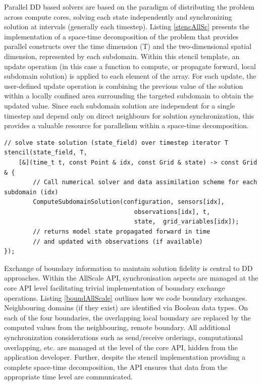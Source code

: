 \documentclass[acmsmall,review,anonymous]{acmart}\settopmatter{printfolios=true,printccs=false,printacmref=false}
\begin{document}
Parallel DD based solvers are based on the paradigm of distributing the problem across compute cores, solving each state independently and synchronizing solution at intervals (generally each timestep). Listing \ref{stencAllSc} presents the implementation of a space-time decomposition of the problem that provides parallel constructs over the time dimension (T) and the two-dimensional spatial dimension, represented by each subdomain. Within this stencil template, an update operation (in this case a function to compute, or propagate forward, local subdomain solution) is applied to each element of the array. For each update, the user-defined update operation is combining the previous value of the solution within a locally confined area surrounding the targeted subdomain to obtain the updated value. Since each subdomain solution are independent for a single timestep and depend only on direct neighbours for solution synchronization, this provides a valuable resource for parallelism within a space-time decomposition. 

\begin{lstlisting}[caption=AllScale Stencil parallel computation, label=stencAllSc]
// solve state solution (state_field) over timestep iterator T
stencil(state_field, T,
    [&](time_t t, const Point & idx, const Grid & state) -> const Grid & {
        // Call numerical solver and data assimilation scheme for each subdomain (idx)
        ComputeSubdomainSolution(configuration, sensors[idx],
                                    observations[idx], t,
                                    state,  grid_variables[idx]);
        // returns model state propagated forward in time
        // and updated with observations (if available)
});
\end{lstlisting}

Exchange of boundary information to maintain solution fidelity is central to DD approaches. Within the AllScale API, synchronisation aspects are managed at the core API level facilitating trivial implementation of boundary exchange operations. Listing \ref{boundAllScale} outlines how we code boundary exchanges. Neighbouring domains (if they exist) are identified via Boolean data types. On each of the four boundaries, the overlapping local boundary are replaced by the computed values from the neighbouring, remote boundary. All additional synchronization considerations such as send/receive orderings, computational overlapping, etc. are managed at the level of the core API, hidden from the application developer. Further, despite the stencil implementation providing a complete space-time decomposition, the API ensures that data from the appropriate time level are communicated. 
\end{document}
